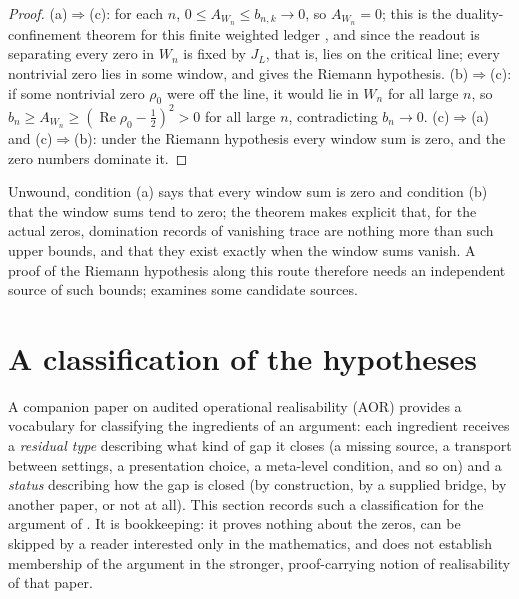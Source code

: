 \documentclass[11pt]{article}
\DeclareMathOperator{\Real}{Re}
\newcommand{\JL}{J_{L}}
\theoremstyle{definition}
\begin{document}
\begin{proof}
(a)\(\Rightarrow\)(c): for each \(n\), \(0\leq A_{W_n}\leq b_{n,k}\to0\), so
\(A_{W_n}=0\); this is the duality-confinement theorem for this finite
weighted ledger \citep[Theorem~7.1]{TsiokosSDTC2026}, and since the readout
is separating every zero in \(W_n\) is fixed by \(\JL\), that is, lies on
the critical line; every nontrivial zero lies in some
window, and  gives the Riemann hypothesis.
(b)\(\Rightarrow\)(c): if some nontrivial zero \(\rho_0\) were off the
line, it would lie in \(W_n\) for all large \(n\), so
\(b_n\geq A_{W_n}\geq(\Real\rho_0-\frac12)^2>0\) for all large \(n\),
contradicting \(b_n\to0\).  (c)\(\Rightarrow\)(a) and
(c)\(\Rightarrow\)(b): under the Riemann hypothesis every window sum is
zero, and the zero numbers dominate it.
\end{proof}

Unwound, condition (a) says that every window sum is zero and
condition (b) that the window sums tend to zero; the theorem makes
explicit that, for the actual zeros, domination records of vanishing
trace are nothing more than such upper bounds, and that they exist
exactly when the window sums vanish.  A
proof of the Riemann hypothesis along this route therefore needs an
independent source of such bounds;  examines
some candidate sources.
 \section{A classification of the hypotheses}
\label{sec:rh-aor-instance}

A companion paper on audited operational realisability (AOR)
\citep{TsiokosAOR2026} provides a vocabulary for classifying the
ingredients of an argument: each ingredient receives a \emph{residual
type} describing what kind of gap it closes (a missing source, a
transport between settings, a presentation choice, a meta-level
condition, and so on) and a \emph{status} describing how the gap is
closed (by construction, by a supplied bridge, by another paper, or
not at all).  This section records such a classification for the
argument of .  It is bookkeeping: it proves nothing about the zeros, can be skipped
by a reader interested only in the mathematics, and does not establish
membership of the
argument in the stronger, proof-carrying notion of realisability of
that paper.
\end{document}
